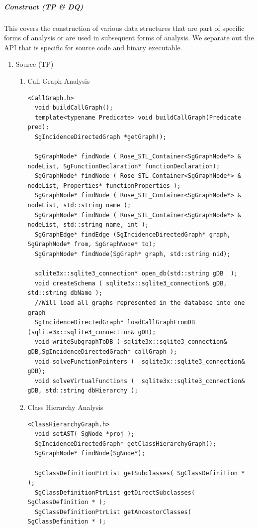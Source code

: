 \subparagraph{Construct (TP \& DQ)}
   This covers the construction of various data structures that are part of
specific forms of analysis or are used in subsequent forms of analysis.
We separate out the API that is specific for source code and binary executable.
\begin{enumerate}
   \item Source (TP) \\
   \begin{enumerate}
      \item Call Graph Analysis
      \begin{lstlisting}
<CallGraph.h>
  void buildCallGraph();
  template<typename Predicate> void buildCallGraph(Predicate pred);
  SgIncidenceDirectedGraph *getGraph(); 

  SgGraphNode* findNode ( Rose_STL_Container<SgGraphNode*> & nodeList, SgFunctionDeclaration* functionDeclaration);
  SgGraphNode* findNode ( Rose_STL_Container<SgGraphNode*> & nodeList, Properties* functionProperties );
  SgGraphNode* findNode ( Rose_STL_Container<SgGraphNode*> & nodeList, std::string name );
  SgGraphNode* findNode ( Rose_STL_Container<SgGraphNode*> & nodeList, std::string name, int );
  SgGraphEdge* findEdge (SgIncidenceDirectedGraph* graph, SgGraphNode* from, SgGraphNode* to);
  SgGraphNode* findNode(SgGraph* graph, std::string nid);

  sqlite3x::sqlite3_connection* open_db(std::string gDB  );
  void createSchema ( sqlite3x::sqlite3_connection& gDB, std::string dbName );
  //Will load all graphs represented in the database into one graph
  SgIncidenceDirectedGraph* loadCallGraphFromDB (sqlite3x::sqlite3_connection& gDB);
  void writeSubgraphToDB ( sqlite3x::sqlite3_connection& gDB,SgIncidenceDirectedGraph* callGraph );
  void solveFunctionPointers (  sqlite3x::sqlite3_connection& gDB);
  void solveVirtualFunctions (  sqlite3x::sqlite3_connection& gDB, std::string dbHierarchy );

      \end{lstlisting}

      \item Class Hierarchy Analysis
      \begin{lstlisting}
<ClassHierarchyGraph.h>
  void setAST( SgNode *proj );
  SgIncidenceDirectedGraph* getClassHierarchyGraph();
  SgGraphNode* findNode(SgNode*);
  
  SgClassDefinitionPtrList getSubclasses( SgClassDefinition * );
  SgClassDefinitionPtrList getDirectSubclasses( SgClassDefinition * );
  SgClassDefinitionPtrList getAncestorClasses( SgClassDefinition * );


\end{lstlisting}
\end{enumerate}
\end{enumerate}
